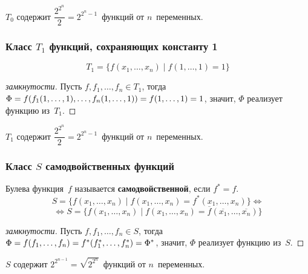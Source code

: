 $T_0$ содержит $\dfrac{2^{2^n}}2 = 2^{2^n - 1}$~функций от $n$~переменных.

\subsubsection{Класс \texorpdfstring{$T_1$}{} функций, сохраняющих константу 1}
\begin{equation*}
T_1 = \{ f(x_1, \ldots, x_n) \mid f(1, \ldots, 1) = 1 \}
\end{equation*}
\begin{proof}[замкнутости]
Пусть $f, f_1, \ldots, f_n \in T_1$, тогда $\Phi =
f(f_1(1, \ldots, 1), \ldots, f_n(1, \ldots, 1)) \opbr=
f(1, \ldots, 1) \opbr= 1$, значит, $\Phi$ реализует функцию из~$T_1$.
\end{proof}

$T_1$ содержит $\dfrac{2^{2^n}}2 = 2^{2^n - 1}$~функций от $n$~переменных.

\subsubsection{Класс \texorpdfstring{$S$}{} самодвойственных функций}
 Булева функция~$f$ называется \textbf{самодвойственной}, если $f^* = f$.
\begin{equation*}
S = \{ f(x_1, \ldots, x_n) \mid
f(x_1, \ldots, x_n) = f^*(x_1, \ldots, x_n) \} \Leftrightarrow
\end{equation*}
\begin{equation*}
\Leftrightarrow S = \{ f(x_1, \ldots, x_n) \mid
f(x_1, \ldots, x_n) = \overline f(\overline{x_1}, \ldots, \overline{x_n}) \}
\end{equation*}
\begin{proof}[замкнутости]
Пусть $f, f_1, \ldots, f_n \in S$, тогда $\Phi = f(f_1, \ldots, f_n) \opbr= f^*(f_1^*, \ldots, f_n^*) \opbr= \Phi^*$, значит, $\Phi$ реализует функцию из~$S$.
\end{proof}

$S$ содержит $2^{2^{n-1}} = \sqrt{2^{2^n}}$~функций от $n$~переменных.

